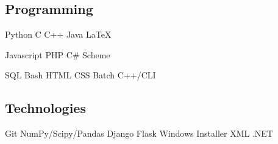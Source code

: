 \documentclass[letterpaper]{deedy-resume} %
\newcommand{\bul}{\textbullet{}}
\begin{document}
\begin{minipage}[t]{0.33\textwidth}
\subsection{Programming}


Python \bul C \bul C++ \bul Java \bul \LaTeX


Javascript \bul PHP \bul C\# \bul Scheme


SQL \bul Bash \bul HTML \bul CSS \bul Batch \bul C++/CLI

\sectionspace %

\subsection{Technologies}

Git \bul NumPy/Scipy/Pandas \bul Django \bul Flask \bul Windows Installer XML
\bul .NET


\end{minipage} %
\hfill
%
%
\end{document}
